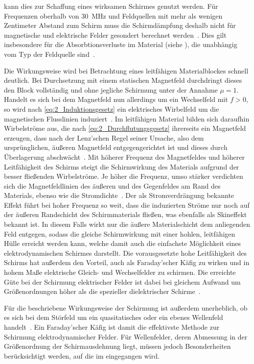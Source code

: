 kann dies zur Schaffung eines wirksamen Schirmes genutzt werden. Für Frequenzen oberhalb von \SI{30}{\mega\hertz} und Feldquellen mit mehr als wenigen Zentimeter Abstand zum Schirm muss die Schirmdämpfung deshalb nicht für magnetische und elektrische Felder gesondert berechnet werden~\cite{Design_of_shielded_enclosures}. Dies gilt insbesondere für die Absorbtionsverluste im Material (siehe \Abschnitt{}), die unabhängig vom Typ der Feldquelle sind~\cite{NASA_SP-3067}.   
\par 
\vspace{\linespace}
Die Wirkungsweise wird bei Betrachtung eines leitfähigen Materialblockes schnell deutlich. Bei Durchsetzung mit einem statischen Magnetfeld durchdringt dieses den Block vollständig und ohne jegliche Schirmung unter der Annahme $\mu = 1$. Handelt es sich bei dem Magnetfeld nun allerdings um ein Wechselfeld mit $f > 0$, so wird nach \Gleichung\eqref{eq:2_Induktionsgesetz} ein elektrisches Wirbelfeld um die magnetischen Flusslinien induziert~\cite{EM_Schirmung}. Im leitfähigen Material bilden sich daraufhin Wirbelströme aus, die nach \Gleichung\eqref{eq:2_Durchflutungsgesetz} ihrerseits ein Magnetfeld erzeugen, dass nach der Lenz'schen Regel seiner Ursache, also dem ursprünglichen, äußeren Magnetfeld entgegengerichtet ist und dieses durch Überlagerung abschwächt~\cite{EM_Schirmung}. Mit höherer Frequenz des Magnetfeldes und höherer Leitfähigkeit des Schirms steigt die Schirmwirkung des Materials aufgrund der besser fließenden Wirbelströme. Je höher die Frequenz, umso stärker verdichten sich die Magnetfeldlinien des äußeren und des Gegenfeldes am Rand des Materials, ebenso wie die Stromdichte~\cite{EM_Schirmung}. Der als Stromverdrängung bekannte Effekt führt bei hoher Frequenz so weit, dass die induzierten Ströme nur noch auf der äußeren Randschicht des Schirmmaterials fließen, was ebenfalls als Skineffekt bekannt ist. In diesem Falls wirkt nur die äußere Materialschicht dem anliegenden Feld entgegen, sodass die gleiche Schirmwirkung mit einer hohlen, leitfähigen Hülle erreicht werden kann, welche damit auch die einfachste Möglichkeit eines elektrodynamischen Schirmes darstellt. Die vorausgesetzte hohe Leitfähigkeit des Schirms hat außerdem den Vorteil, auch als Faraday'scher Käfig zu wirken und in hohem Maße elektrische Gleich- und Wechselfelder zu schirmen. Die erreichte Güte bei der Schirmung elektrischer Felder ist dabei bei gleichem Aufwand um Größenordnungen höher als die spezieller dielektrischer Schirme~\cite{EM_Schirmung}.
\par
\vspace{\linespace}
Für die beschriebene Wirkungsweise der Schirmung ist außerdem unerheblich, ob es sich bei dem Störfeld um ein quasitatisches oder ein ebenes Wellenfeld handelt~\cite{EM_Schirmung}. Ein Faraday'scher Käfig ist damit die effektivste Methode zur Schirmung elektrodynamischer Felder. Für Wellenfelder, deren Abmessung in der Größenordnung der Schirmausdehnung liegt, müssen jedoch Besonderheiten berücksichtigt werden, auf die im \Abschnitt{} eingegangen wird.  


